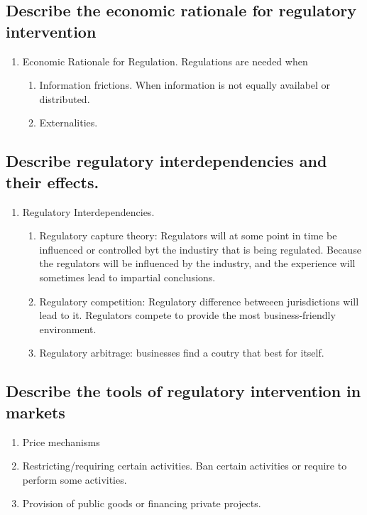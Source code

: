 \documentclass{article}
\newcommand{\be}{\begin{enumerate}}
\newcommand{\ee}{\end{enumerate}}
\begin{document}
\subsection{Describe the economic rationale for regulatory intervention}
\be
    \item Economic Rationale for Regulation. Regulations are needed when
        \be 
            \item Information frictions. When information is not equally availabel or distributed.
            \item Externalities. 
        \ee
\ee
\subsection{Describe regulatory interdependencies and their effects.}
\be
    \item Regulatory Interdependencies.
        \be
            \item Regulatory capture theory: Regulators will at some point in time
                be influenced or controlled byt the industiry that is being regulated.
                Because the regulators will be influenced by the industry, and the
                experience will sometimes lead to impartial conclusions.
            \item Regulatory competition: Regulatory difference betweeen jurisdictions will lead to it.
                Regulators compete to provide the most business-friendly environment.
            \item Regulatory arbitrage: businesses find a coutry that best for itself.
        \ee
\ee
\subsection{Describe the tools of regulatory intervention in markets}
\be
    \item Price mechanisms
    \item Restricting/requiring certain activities. Ban certain activities or 
        require to perform some activities.
    \item Provision of public goods or financing private projects. 
\ee
\end{document}
